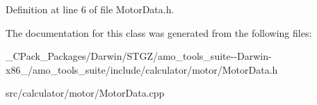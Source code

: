 Definition at line 6 of file Motor\+Data.\+h.



The documentation for this class was generated from the following files\+:\begin{DoxyCompactItemize}
\item 
\+\_\+\+C\+Pack\+\_\+\+Packages/\+Darwin/\+S\+T\+G\+Z/amo\+\_\+tools\+\_\+suite-\/-\/\+Darwin-\/x86\+\_/amo\+\_\+tools\+\_\+suite/include/calculator/motor/Motor\+Data.\+h\item 
src/calculator/motor/Motor\+Data.\+cpp\end{DoxyCompactItemize}
